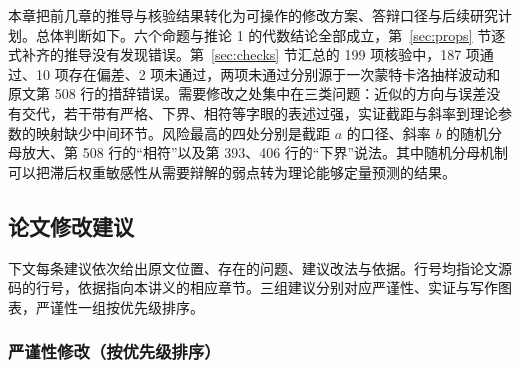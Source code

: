 
本章把前几章的推导与核验结果转化为可操作的修改方案、答辩口径与后续研究计划。总体判断如下。六个命题与推论 1 的代数结论全部成立，第~\ref{sec:props} 节逐式补齐的推导没有发现错误。第~\ref{sec:checks} 节汇总的 199 项核验中，187 项通过、10 项存在偏差、2 项未通过，两项未通过分别源于一次蒙特卡洛抽样波动和原文第 508 行的措辞错误。需要修改之处集中在三类问题：近似的方向与误差没有交代，若干带有严格、下界、相符等字眼的表述过强，实证截距与斜率到理论参数的映射缺少中间环节。风险最高的四处分别是截距 $a$ 的口径、斜率 $b$ 的随机分母放大、第 508 行的“相符”以及第 393、406 行的“下界”说法。其中随机分母机制可以把滞后权重敏感性从需要辩解的弱点转为理论能够定量预测的结果。

\subsection{论文修改建议}\label{sub:ad-revise}

下文每条建议依次给出原文位置、存在的问题、建议改法与依据。行号均指论文源码的行号，依据指向本讲义的相应章节。三组建议分别对应严谨性、实证与写作图表，严谨性一组按优先级排序。

\subsubsection{严谨性修改（按优先级排序）}

